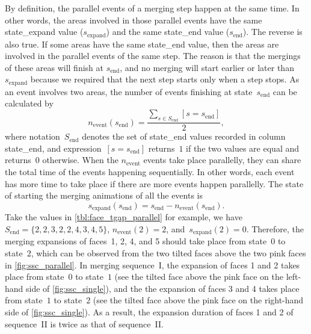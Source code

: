 \documentclass[ijgi,article,submit,moreauthors,pdftex]{Definitions/mdpi}
\begin{document}
By definition, the parallel events of a merging step happen at the same time.
In other words, the areas involved in those parallel events have 
the same state\_expand value ($s_\mathrm{expand}$) and 
the same state\_end value ($s_\mathrm{end}$).
The reverse is also true.
If some areas have the same state\_end value,
then the areas are involved in the parallel events of the same step.
The reason is that the mergings of these areas will finish at $s_\mathrm{end}$,
and no merging will start earlier or later than $s_\mathrm{expand}$
because we required that the next step starts only when a step stops.
As an event involves two areas,
the number of events finishing at state~$s_\mathrm{end}$ can be calculated by
\begin{equation}
\label{eq:n_event_state}
n_\mathrm{event} (s_\mathrm{end}) = 
\frac{\sum\limits_{s \in S_\mathrm{end}} [s=s_\mathrm{end}]}{2},
\end{equation}
where notation~$S_\mathrm{end}$ denotes the set of state\_end values
recorded in column state\_end,
and expression~$[s=s_\mathrm{end}]$ returns~$1$ if the two values are equal 
and returns~$0$ otherwise.
When the $n_\mathrm{event}$ events take place parallelly, 
they can share the total time of the events happening sequentially.
In other words, each event has more time to take place 
if there are more events happen parallelly.
The state of starting the merging animations of all the events is
\begin{equation}
\label{eq:s_expand_state}
s_\mathrm{expand} (s_\mathrm{end}) = s_\mathrm{end} - n_\mathrm{event} (s_\mathrm{end}).
\end{equation}
Take the values in \tbl\ref{tbl:face_tgap_parallel} for example,
we have~$S_\mathrm{end} = \{2, 2, 3, 2, 2, 4, 3, 4, 5\}$, 
$n_\mathrm{event} (2) = 2$, and~$s_\mathrm{expand} (2) = 0$.
Therefore, the merging expansions of faces~1, 2, 4, and 5 
should take place from state~$0$ to state~$2$,
which can be observed from the two tilted faces above the two pink faces 
in \fig\ref{fig:ssc_parallel}.
In merging sequence~I, the expansion of faces 1 and 2 
takes place from state~$0$ to state~$1$
(see the tilted face above the pink face on the left-hand side of \fig\ref{fig:ssc_single}),
and the the expansion of faces 3 and 4
takes place from state~$1$ to state~$2$
(see the tilted face above the pink face on the right-hand side of \fig\ref{fig:ssc_single}).
As a result, the expansion duration of faces 1 and 2 of sequence~II
is twice as that of sequence~II. 


%
\end{document}

